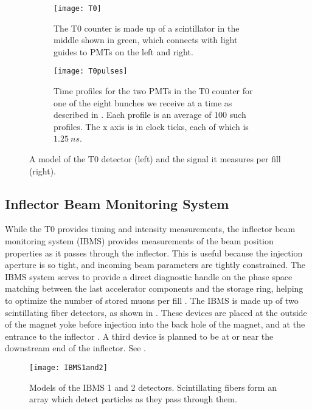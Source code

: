 \begin{figure}[]
\centering
    \begin{subfigure}[t]{0.45\textwidth}
        \centering
        \texttt{[image: T0]}
        \caption{The T0 counter is made up of a scintillator in the middle shown in green, which connects with light guides to PMTs on the left and right.}
    \label{fig:T0counter}
    \end{subfigure}%
    \hspace{1cm}
    \begin{subfigure}[t]{0.45\textwidth}
        \centering
        \texttt{[image: T0pulses]}
        \caption{Time profiles for the two PMTs in the T0 counter for one of the eight bunches we receive at a time as described in . Each profile is an average of 100 such profiles. The x axis is in clock ticks, each of which is $\SI{1.25}{ns}$.}
    \label{fig:T0pulses}    
    \end{subfigure}
\caption[T0 counter and pulses]{A model of the T0 detector (left) and the signal it measures per fill (right).}
\label{fig:T0}
\end{figure}


\subsection{Inflector Beam Monitoring System}
\label{sec:IBMS}

While the T0 provides timing and intensity measurements, the inflector beam monitoring system (IBMS) provides measurements of the beam position properties as it passes through the inflector. This is useful because the injection aperture is so tight, and incoming beam parameters are tightly constrained. The IBMS system serves to provide a direct diagnostic handle on the phase space matching between the last accelerator components and the \gmtwo storage ring, helping to optimize the number of stored muons per fill \cite{ibms1}. The IBMS is made up of two scintillating fiber detectors, as shown in . These devices are placed at the outside of the magnet yoke before injection into the back hole of the magnet, and at the entrance to the inflector \cite{ibms2}. A third device is planned to be at or near the downstream end of the inflector. See . 


\begin{figure}[]
    \centering
    \texttt{[image: IBMS1and2]}
    \caption[IBMS Models]{Models of the IBMS 1 and 2 detectors. Scintillating fibers form an array which detect particles as they pass through them.}   
    \label{fig:IBMS1and2}
\end{figure}

